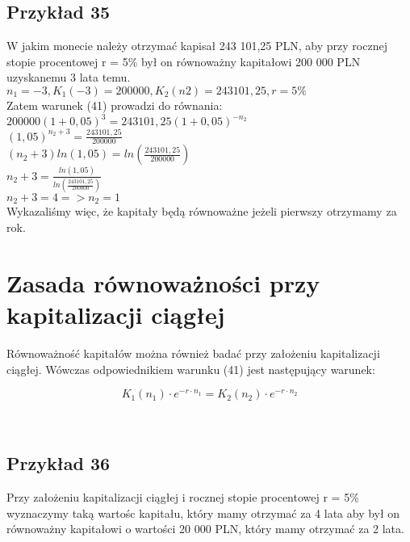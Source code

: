 \documentclass{article}
\begin{document}
\subsection{Przykład 35}
W jakim monecie należy otrzymać kapisał 243 101,25 PLN, aby przy rocznej stopie procentowej r = 5\% był on równoważny kapitałowi 200 000 PLN uzyskanemu 3 lata temu.\\

$ n_1 = -3, K_1(-3) = 200 000, K_2(n2) = 243 101,25, r = 5\% $\\

Zatem warunek (41) prowadzi do równania:\\

$ 200 000(1 + 0,05)^3 = 243 101,25(1 + 0,05)^{-n_2} $\\

$ (1,05)^{n_2 + 3} = \frac{243 101,25}{200 000} $\\

$ (n_2 + 3) ln(1,05) = ln(\frac{243 101,25}{200 000}) $\\

$ n_2 + 3 = \frac{ln(1,05)}{ln(\frac{243 101,25}{200 000})} $\\

$ n_2 + 3 = 4 => n_2 = 1 $\\

Wykazaliśmy więc, że kapitały będą równoważne jeżeli pierwszy otrzymamy za rok.

\newpage

\section{Zasada równoważności przy kapitalizacji ciągłej}
Równoważność kapitałów można również badać przy założeniu kapitalizacji ciągłej. Wówczas odpowiednikiem warunku (41) jest następujący warunek:

\begin{center}
	\begin{equation}
		K_1(n_1) \cdot e ^{-r \cdot n_1} = K_2(n_2) \cdot e ^{-r \cdot n_2}
	\end{equation}
\end{center}\\

\subsection{Przykład 36}
Przy założeniu kapitalizacji ciągłej i rocznej stopie procentowej r = 5\% wyznaczymy taką wartośc kapitału, który mamy otrzymać za 4 lata aby był on równoważny kapitałowi o wartości 20 000 PLN, który mamy otrzymać za 2 lata.\\
\end{document}

